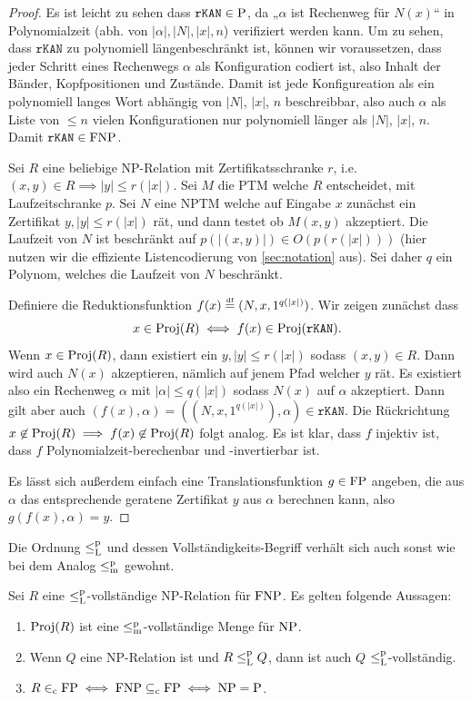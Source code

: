 \begin{proof}
    Es ist leicht zu sehen dass $\mathtt{rKAN}\in\P$, da „$\alpha$ ist Rechenweg für $N(x)$“ in Polynomialzeit (abh. von $|\alpha|, |N|, |x|, n$) verifiziert werden kann. Um zu sehen, dass  $\mathtt{rKAN}$ zu polynomiell längenbeschränkt ist, können wir voraussetzen, dass jeder Schritt eines Rechenwegs $\alpha$ als Konfiguration codiert ist, also Inhalt der Bänder, Kopfpositionen und Zustände. Damit ist jede Konfigureation als ein polynomiell langes Wort abhängig von $|N|$, $|x|$, $n$ beschreibbar, also auch $\alpha$ als Liste von $\leq n$ vielen Konfigurationen nur polynomiell länger als $|N|$, $|x|$, $n$.
    Damit $\mathtt{rKAN}\in\FNP$.

    Sei $R$ eine beliebige NP-Relation mit Zertifikatsschranke $r$, i.e. $(x,y)\in R\implies |y|\leq r(|x|)$. Sei $M$ die PTM welche $R$ entscheidet, mit Laufzeitschranke $p$. Sei $N$ eine NPTM welche auf Eingabe $x$ zunächst ein Zertifikat $y, |y|\leq r(|x|)$ rät, und dann testet ob $M(x,y)$ akzeptiert. Die Laufzeit von $N$ ist beschränkt auf $p(|(x,y)|)\in O(p(r(|x|)))$ (hier nutzen wir die effiziente Listencodierung von \ref{sec:notation} aus). Sei daher $q$ ein Polynom, welches die Laufzeit von $N$ beschränkt.

    Definiere die Reduktionsfunktion $f(x)\defeq(N, x, 1^{q(|x|)})$. Wir zeigen zunächst dass
    \[ x\in \Proj(R)\iff f(x)\in \Proj(\mathtt{rKAN}). \]
    Wenn $x\in\Proj(R)$, dann existiert ein $y, |y|\leq r(|x|)$ sodass $(x,y)\in R$. Dann wird auch $N(x)$ akzeptieren, nämlich auf jenem Pfad welcher $y$ rät. Es existiert also ein Rechenweg $\alpha$ mit $|\alpha|\leq q(|x|)$ sodass $N(x)$ auf $\alpha$ akzeptiert. Dann gilt aber auch $(f(x), \alpha)=((N,x,1^{q(|x|)}),\alpha)\in \mathtt{rKAN}$.
    Die Rückrichtung $x\not\in \Proj(R)\implies f(x)\not\in\Proj(R)$ folgt analog.
    Es ist klar, dass $f$ injektiv ist, dass $f$ Polynomialzeit-berechenbar und -invertierbar ist. 

    Es lässt sich außerdem einfach eine Translationsfunktion $g\in \FP$ angeben, die  aus $\alpha$ das entsprechende geratene Zertifikat $y$ aus $\alpha$ berechnen kann, also $g(f(x), \alpha)=y$.
\end{proof}

Die Ordnung $\leqlp$ und dessen Vollständigkeits-Begriff verhält sich auch sonst wie bei dem Analog $\leqmp$ gewohnt.
\begin{lemma}\label{lemma:fnp-completeness}
    Sei $R$ eine $\leqlp$-vollständige NP-Relation für $\FNP$. Es gelten folgende Aussagen:
    \begin{enumerate}
        \item $\Proj(R)$ ist eine $\leqmp$-vollständige Menge für $\NP$.
        \item Wenn $Q$ eine NP-Relation ist und $R\leqlp Q$, dann ist auch $Q$ $\leqlp$-vollständig.
        \item $R\inc \FP \iff \FNP \subseteqc \FP \iff \NP=\P$.
    \end{enumerate}
\end{lemma}

